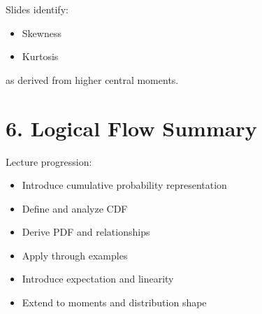 \documentclass[11pt]{article}
\begin{document}
Slides identify:

\begin{itemize}
\item Skewness
\item Kurtosis
\end{itemize}

as derived from higher central moments.

\section*{6. Logical Flow Summary}

Lecture progression:

\begin{itemize}
\item Introduce cumulative probability representation
\item Define and analyze CDF
\item Derive PDF and relationships
\item Apply through examples
\item Introduce expectation and linearity
\item Extend to moments and distribution shape
\end{itemize}
\end{document}

